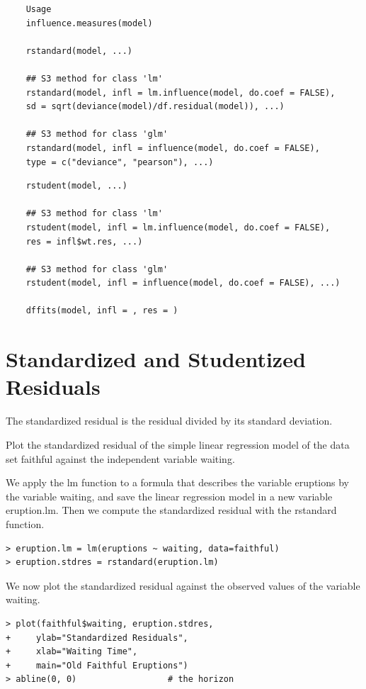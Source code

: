 \documentclass[residuals.tex]{subfiles}
\begin{document}
\begin{framed}
	\begin{verbatim}
	Usage
	influence.measures(model)
	
	rstandard(model, ...)
	
	## S3 method for class 'lm'
	rstandard(model, infl = lm.influence(model, do.coef = FALSE),
	sd = sqrt(deviance(model)/df.residual(model)), ...)
	
	## S3 method for class 'glm'
	rstandard(model, infl = influence(model, do.coef = FALSE),
	type = c("deviance", "pearson"), ...)
	\end{verbatim}
\end{framed}

\begin{framed}
	\begin{verbatim}
	rstudent(model, ...)
	
	## S3 method for class 'lm'
	rstudent(model, infl = lm.influence(model, do.coef = FALSE),
	res = infl$wt.res, ...)
	
	## S3 method for class 'glm'
	rstudent(model, infl = influence(model, do.coef = FALSE), ...)
	
	dffits(model, infl = , res = )
	\end{verbatim}
\end{framed}
\newpage


\section{Standardized and Studentized Residuals}
The standardized residual is the residual divided by its standard deviation. 
 
Plot the standardized residual of the simple linear regression model of the data set faithful against the independent variable waiting.

We apply the lm function to a formula that describes the variable eruptions by the variable waiting, and save the linear regression model in a new variable eruption.lm. Then we compute the standardized residual with the rstandard function.

\begin{framed}
\begin{verbatim}
> eruption.lm = lm(eruptions ~ waiting, data=faithful) 
> eruption.stdres = rstandard(eruption.lm) 
\end{verbatim}
\end{framed}
We now plot the standardized residual against the observed values of the variable waiting.
\begin{framed}
\begin{verbatim}
> plot(faithful$waiting, eruption.stdres, 
+     ylab="Standardized Residuals", 
+     xlab="Waiting Time", 
+     main="Old Faithful Eruptions") 
> abline(0, 0)                  # the horizon
\end{verbatim}
\end{framed}
\end{document}
